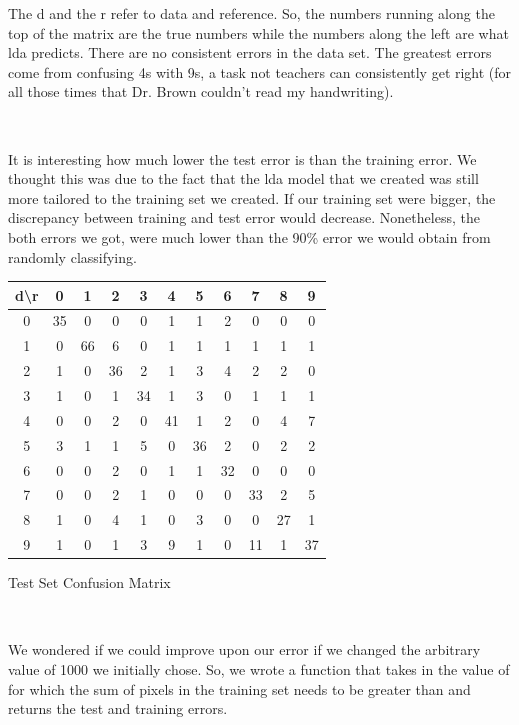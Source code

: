 \documentclass[10pt]{extarticle}
\begin{document}
\begin{minipage}{.4\textwidth}
The d and the r refer to data and reference. So, the numbers running along the top of the matrix are the true numbers while the numbers along the left are what lda predicts. There are no consistent errors in the data set. The greatest errors come from confusing 4s with 9s, a task not teachers can consistently get right (for all those times that Dr. Brown couldn't read my handwriting).
\end{minipage}\\
\begin{minipage}{.45\textwidth}
	It is interesting how much lower the test error is than the training error. We thought this was due to the fact that the lda model that we created was still more tailored to the training set we created. If our training set were bigger, the discrepancy between training and test error would decrease. Nonetheless, the both errors we got, were much lower than the 90\% error we would obtain from randomly classifying.
\end{minipage}
\begin{minipage}{.05\textwidth}
	\quad
\end{minipage}
\begin{minipage}{.5\textwidth}
	\begin{center}
	\begin{tabular}{c | c c c c c c c c c c}
		d\textbackslash r & 0 & 1 & 2 & 3 & 4 & 5 & 6 & 7 & 8 & 9\\ \hline
		0&35&0&0&0&1&1&2&0&0&0\\
		1&0&66&6&0&1&1&1&1&1&1\\
		2&1&0&36&2&1&3&4&2&2&0\\
		3&1&0&1&34&1&3&0&1&1&1\\
		4&0&0&2&0&41&1&2&0&4&7\\
		5&3&1&1&5&0&36&2&0&2&2\\
		6&0&0&2&0&1&1&32&0&0&0\\
		7&0&0&2&1&0&0&0&33&2&5\\
		8&1&0&4&1&0&3&0&0&27&1\\
		9&1&0&1&3&9&1&0&11&1&37\\
	\end{tabular}
	\bigskip
	Test Set Confusion Matrix
	\end{center}
	\textrm{ }\\
\end{minipage}	
We wondered if we could improve upon our error if we changed the arbitrary value of 1000 we initially chose. So, we wrote a function that takes in the value of for which the sum of pixels in the training set needs to be greater than and returns the test and training errors.\\\\
\end{document}
